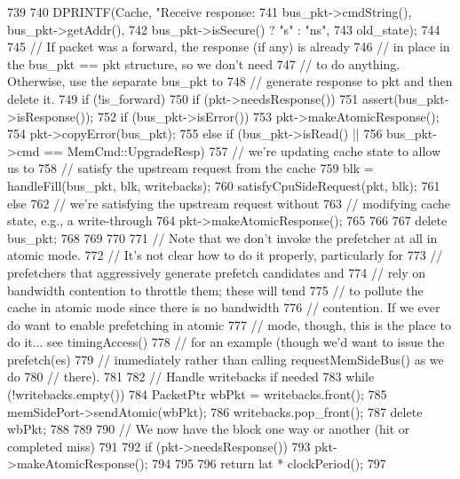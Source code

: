 \begin{DoxyCode}
{{739 
740         DPRINTF(Cache, "Receive response: %
741                 bus_pkt->cmdString(), bus_pkt->getAddr(),
742                 bus_pkt->isSecure() ? "s" : "ns",
743                 old_state);
744 
745         // If packet was a forward, the response (if any) is already
746         // in place in the bus_pkt == pkt structure, so we don't need
747         // to do anything.  Otherwise, use the separate bus_pkt to
748         // generate response to pkt and then delete it.
749         if (!is_forward) {
750             if (pkt->needsResponse()) {
751                 assert(bus_pkt->isResponse());
752                 if (bus_pkt->isError()) {
753                     pkt->makeAtomicResponse();
754                     pkt->copyError(bus_pkt);
755                 } else if (bus_pkt->isRead() ||
756                            bus_pkt->cmd == MemCmd::UpgradeResp) {
757                     // we're updating cache state to allow us to
758                     // satisfy the upstream request from the cache
759                     blk = handleFill(bus_pkt, blk, writebacks);
760                     satisfyCpuSideRequest(pkt, blk);
761                 } else {
762                     // we're satisfying the upstream request without
763                     // modifying cache state, e.g., a write-through
764                     pkt->makeAtomicResponse();
765                 }
766             }
767             delete bus_pkt;
768         }
769     }
770 
771     // Note that we don't invoke the prefetcher at all in atomic mode.
772     // It's not clear how to do it properly, particularly for
773     // prefetchers that aggressively generate prefetch candidates and
774     // rely on bandwidth contention to throttle them; these will tend
775     // to pollute the cache in atomic mode since there is no bandwidth
776     // contention.  If we ever do want to enable prefetching in atomic
777     // mode, though, this is the place to do it... see timingAccess()
778     // for an example (though we'd want to issue the prefetch(es)
779     // immediately rather than calling requestMemSideBus() as we do
780     // there).
781 
782     // Handle writebacks if needed
783     while (!writebacks.empty()){
784         PacketPtr wbPkt = writebacks.front();
785         memSidePort->sendAtomic(wbPkt);
786         writebacks.pop_front();
787         delete wbPkt;
788     }
789 
790     // We now have the block one way or another (hit or completed miss)
791 
792     if (pkt->needsResponse()) {
793         pkt->makeAtomicResponse();
794     }
795 
796     return lat * clockPeriod();
797 }
\end{DoxyCode}
